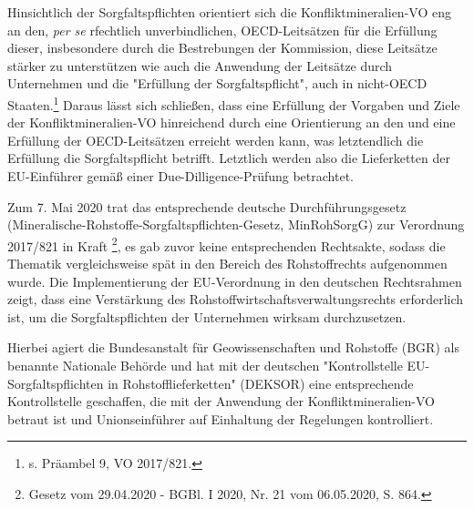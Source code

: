 \documentclass[12pt,a4paper,oneside]{book} %
\begin{document}
	Hinsichtlich der Sorgfaltspflichten orientiert sich die Konfliktmineralien-VO eng an den, \textit{per se} rfechtlich unverbindlichen, OECD-Leitsätzen \autocite{OECDleitfaden2019} für die Erfüllung dieser, insbesondere durch die Bestrebungen der Kommission, diese Leitsätze stärker zu unterstützen wie auch die Anwendung der Leitsätze durch Unternehmen und die "Erfüllung der Sorgfaltspflicht", auch in nicht-OECD Staaten.\footnote{s. Präambel 9, VO 2017/821.} Daraus lässt sich schließen, dass eine Erfüllung der Vorgaben und Ziele der Konfliktmineralien-VO hinreichend durch eine Orientierung an den und eine Erfüllung der OECD-Leitsätzen erreicht werden kann, was letztendlich die Erfüllung die Sorgfaltspflicht betrifft. Letztlich werden also die Lieferketten der EU-Einführer gemäß einer Due-Dilligence-Prüfung betrachtet.\autocite[Rn. 390]{ruttloff_lieferkettensorgfaltspflichtengesetz_2022}
	
	
	
	Zum 7. Mai 2020 trat das entsprechende deutsche Durchführungsgesetz (Mineralische-Rohstoffe-Sorgfaltspflichten-Gesetz, MinRohSorgG) zur Verordnung 2017/821 in Kraft \footnote{Gesetz vom 29.04.2020 - BGBl. I 2020, Nr. 21 vom 06.05.2020, S. 864.}, es gab zuvor keine entsprechenden Rechtsakte, sodass die Thematik vergleichsweise spät in den Bereich des Rohstoffrechts aufgenommen wurde. Die Implementierung der EU-Verordnung in den deutschen Rechtsrahmen zeigt, dass eine Verstärkung des Rohstoffwirtschaftsverwaltungsrechts erforderlich ist, um die Sorgfaltspflichten der Unternehmen wirksam durchzusetzen.
	
	Hierbei agiert die Bundesanstalt für Geowissenschaften und Rohstoffe (BGR) als benannte Nationale Behörde und hat mit der deutschen "Kontrollstelle EU-Sorgfaltspflichten in Rohstofflieferketten" (DEKSOR) eine entsprechende Kontrollstelle geschaffen, die mit der Anwendung der Konfliktmineralien-VO betraut ist und Unionseinführer auf Einhaltung der Regelungen kontrolliert. 
	
\end{document}
